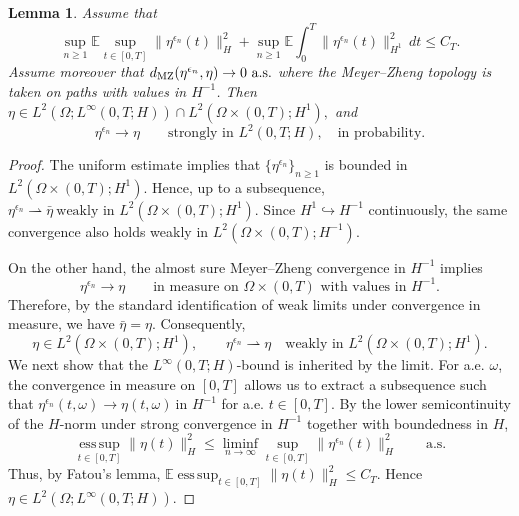 \documentclass[11pt]{article}
\theoremstyle{plain}
\newtheorem{lemma}[theorem]{Lemma}
\numberwithin{equation}{section}
\begin{document}
   
\begin{lemma}\label{lem:MZ-H-strong}
Assume that
\[
\sup_{n\ge1}\mathbb E\sup_{t\in[0,T]}\|\eta^{\epsilon_n}(t)\|_H^2+\sup_{n\ge1}\mathbb E\int_0^T\|\eta^{\epsilon_n}(t)\|_{H^1}^2\,dt
\le C_T .
\]
Assume moreover that \(d_{\rm MZ}(\eta^{\epsilon_n},\eta)\to0~ \text{a.s.}\)
where the Meyer--Zheng topology is taken on paths with values in
\(H^{-1}\). Then \(\eta\in L^2(\Omega;L^\infty(0,T;H))\cap L^2(\Omega\times(0,T);H^1),\)
and
\[
\eta^{\epsilon_n}\to\eta\qquad\text{strongly in }L^2(0,T;H), \quad \text{in probability}.
\]
\end{lemma}

\begin{proof}
The uniform estimate implies that \(\{\eta^{\epsilon_n}\}_{n\ge1}\) is bounded in \(L^2(\Omega\times(0,T);H^1)\). Hence, up to a subsequence,
\(\eta^{\epsilon_n}\rightharpoonup \bar\eta ~ \text{weakly in }L^2(\Omega\times(0,T);H^1).\)
Since \(H^1\hookrightarrow H^{-1}\) continuously, the same convergence also holds weakly in \(L^2(\Omega\times(0,T);H^{-1})\).

On the other hand, the almost sure Meyer--Zheng convergence in \(H^{-1}\) implies
\[
\eta^{\epsilon_n}\to \eta \qquad\text{in measure on }\Omega\times(0,T)\text{ with values in }H^{-1}.
\]
Therefore, by the standard identification of weak limits under convergence in measure, we have \(\bar\eta=\eta\). Consequently,
\[
\eta\in L^2(\Omega\times(0,T);H^1), \qquad\eta^{\epsilon_n}\rightharpoonup\eta\quad\text{weakly in }L^2(\Omega\times(0,T);H^1).
\]
We next show that the \(L^\infty(0,T;H)\)-bound is inherited by the limit. For a.e. \(\omega\), the convergence in measure on \([0,T]\) allows us to
extract a subsequence such that \(\eta^{\epsilon_n}(t,\omega)\to\eta(t,\omega)~\text{in }H^{-1}\) for a.e. \(t\in[0,T]\). By the lower semicontinuity of the \(H\)-norm under
strong convergence in \(H^{-1}\) together with boundedness in \(H\),
\[
\operatorname*{ess\,sup}_{t\in[0,T]}\|\eta(t)\|_H^2 \le\liminf_{n\to\infty}\sup_{t\in[0,T]}\|\eta^{\epsilon_n}(t)\|_H^2\qquad \text{a.s.}
\]
Thus, by Fatou's lemma, \(\mathbb E\operatorname*{ess\,sup}_{t\in[0,T]}\|\eta(t)\|_H^2\le C_T .\)
Hence \(\eta\in L^2(\Omega;L^\infty(0,T;H)).\)


\end{proof}
\end{document}
